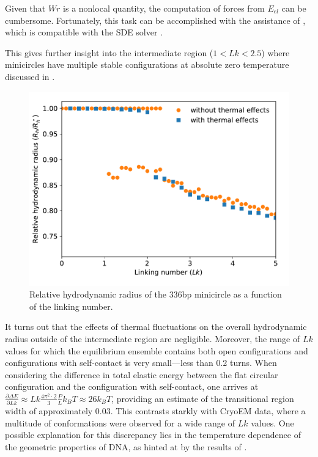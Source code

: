 \documentclass{doctoral}
\newcommand{\code}[1]{\texttt{\detokenize{#1}}}
\begin{document}
Given that $Wr$ is a nonlocal quantity, the computation of forces from $E_{el}$ can be cumbersome.
Fortunately, this task can be accomplished with the assistance of \code{jax.grad}, which is compatible with the SDE solver \code{pychastic}.

This gives further insight into the intermediate region ($1 < Lk < 2.5$) where minicircles have multiple stable configurations at absolute zero temperature discussed in \textcite{Waszkiewicz_2023_dna}.

\begin{figure}[htbp]
    \centering
    \includegraphics[height=0.5\linewidth]{figures/with_thermal_effects.pdf}
    \caption{Relative hydrodynamic radius of the 336bp minicircle as a function of the linking number.}
    \label{fig:thermalized_loops}
\end{figure}

It turns out that the effects of thermal fluctuations on the overall hydrodynamic radius outside of the intermediate region are negligible.
Moreover, the range of $Lk$ values for which the equilibrium ensemble contains both open configurations and configurations with self-contact is very small—less than 0.2 turns.
When considering the difference in total elastic energy between the flat circular configuration and the configuration with self-contact, one arrives at $\frac{\partial \Delta E}{\partial Lk} \approx Lk \frac{4\pi^2 \cdot 2}{3} \frac{P}{L} k_B T \approx 26 k_B T$, providing an estimate of the transitional region width of approximately $0.03$.
This contrasts starkly with CryoEM data\cite{Irobalieva_2015}, where a multitude of conformations were observed for a wide range of $Lk$ values.
One possible explanation for this discrepancy lies in the temperature dependence of the geometric properties of DNA, as hinted at by the results of \textcite{Ranasinghe_2023}.
\end{document}
